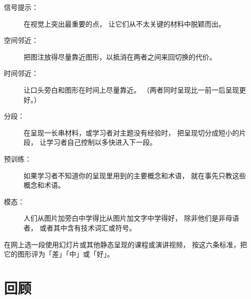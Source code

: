 \begin{description}

\item[信号提示：]
  在视觉上突出最重要的点，
  让它们从不太关键的材料中脱颖而出。

\item[空间邻近：]
  把图注放得尽量靠近图形，以抵消在两者之间来回切换的代价。

\item[时间邻近：]
  让口头旁白和图形在时间上尽量靠近。
  （两者同时呈现比一前一后呈现更好。）

\item[分段：]
  在呈现一长串材料，或学习者对主题没有经验时，
  把呈现切分成短小的片段，
  让学习者自己控制以多快进入下一段。

\item[预训练：]
  如果学习者不知道你的呈现里用到的主要概念和术语，
  就在事先只教这些概念和术语。

\item[模态：]
  人们从图片加旁白中学得比从图片加文字中学得好，
  除非他们是非母语者，
  或者其中含有技术词汇或符号。

\end{description}

在网上选一段使用幻灯片或其他静态呈现的课程或演讲视频，
按这六条标准，把它的图形评为「差」「中」或「好」。

\section*{回顾}

